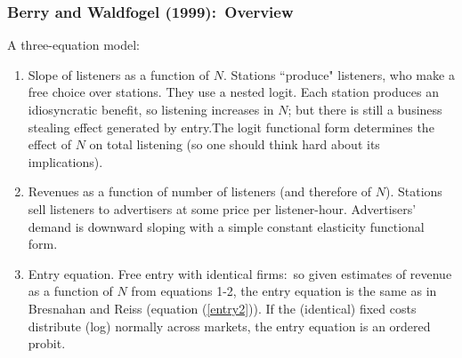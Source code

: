 \begin{frame}%

\frametitle{Berry and Waldfogel (1999):\ Overview}

A three-equation model:

\begin{enumerate}
\item Slope of listeners as a function of $N.$ Stations ``produce" listeners,
who make a free choice over stations. They use a nested logit. Each station
produces an idiosyncratic benefit, so listening increases in $N$; but there
is still a business stealing effect generated by entry.The logit functional
form determines the effect of $N$ on total listening (so one should think
hard about its implications).

\item Revenues as a function of number of listeners (and therefore of $N$).
Stations sell listeners to advertisers at some price per listener-hour.
Advertisers' demand is downward sloping with a simple constant elasticity
functional form.

\item Entry equation. Free entry with identical firms:\ so given estimates
of revenue as a function of $N$ from equations 1-2, the entry equation is
the same as in Bresnahan and Reiss (equation (\ref{entry2})). If the
(identical) fixed costs distribute (log) normally across markets, the entry
equation is an ordered probit.
\end{enumerate}

\end{frame}%

